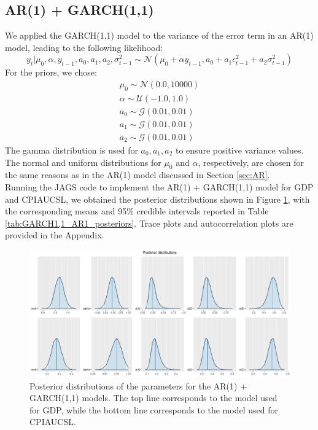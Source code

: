 \subsection*{AR(1) + GARCH(1,1)}
We applied the GARCH(1,1) model to the variance of the error term in an AR(1) model, leading to the following likelihood:
\begin{equation}
    \label{eq:GARCH1,1_likelihood}
    y_{t}|\mu_{0},\alpha,y_{t-1},a_0,a_1,a_2,\sigma^2_{t-1} \sim \mathcal{N}(\mu_{0} + \alpha y_{t-1}, a_0 + a_1 \epsilon^2_{t-1} + a_2 \sigma^2_{t-1})
\end{equation}
For the priors, we chose:
\begin{equation}
    \label{eq:GARCH1,1_priors}
    \begin{split}
        \mu_0 \sim \mathcal{N}(0.0, 10000) \\
        \alpha \sim \mathcal{U}(-1.0, 1.0) \\
        a_0 \sim \mathcal{G}(0.01, 0.01) \\
        a_1 \sim \mathcal{G}(0.01, 0.01) \\
        a_2 \sim \mathcal{G}(0.01, 0.01)
    \end{split}
\end{equation}
The gamma distribution is used for $a_0, a_1, a_2$ to ensure positive variance values. The normal and uniform distributions for $\mu_{0}$ and $\alpha$, respectively, are chosen for the same reasons as in the AR(1) model discussed in Section \ref{sec:AR}. \\
Running the JAGS code to implement the AR(1) + GARCH(1,1) model for GDP and CPIAUCSL, we obtained the posterior distributions shown in Figure \ref{fig:GARCH1,1_AR1_posteriors}, with the corresponding means and 95\% credible intervals reported in Table \ref{tab:GARCH1,1_AR1_posteriors}. Trace plots and autocorrelation plots are provided in the Appendix. \\
\begin{figure}[H]
    \centering
    \includegraphics[width=\textwidth]{images/5-GARCH/posteriors.png}
    \caption{Posterior distributions of the parameters for the AR(1) + GARCH(1,1) models. The top line corresponds to the model used for GDP, while the bottom line corresponds to the model used for CPIAUCSL.}
    \label{fig:GARCH1,1_AR1_posteriors}
\end{figure}
